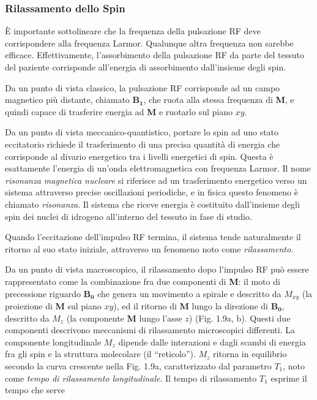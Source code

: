 \documentclass[leqno,10pt,twocolumn,a4paper]{article}
\begin{document}
	\subsubsection{Rilassamento dello Spin}
	È importante sottolineare che la frequenza della pulsazione RF deve corrispondere alla frequenza Larmor. Qualunque altra frequenza non sarebbe efficace. Effettivamente, l'assorbimento della pulsazione RF da
	parte del tessuto del paziente corrisponde all'energia di assorbimento dall'insieme degli spin. \par Da un punto di vista classico, la pulsazione RF corrisponde ad un campo magnetico più distante, chiamato
	$\boldsymbol{B_1}$, che ruota alla stessa frequenza di \textbf{M}, e quindi capace di trasferire energia ad \textbf{M} e ruotarlo sul piano $xy$. \par Da un punto di vista meccanico-quantistico, portare lo
	spin ad uno stato eccitatorio richiede il trasferimento di una precisa quantità di energia che corrisponde al divario energetico tra i livelli energetici di spin. Questa è esattamente l'energia di un'onda
	elettromagnetica con frequenza Larmor. Il nome \textit{risonanza magnetica nucleare} si riferisce ad un trasferimento energetico verso un sistema attraverso precise oscillazioni periodiche, e in fisica questo
	fenomeno è chiamato \textit{risonanza}. Il sistema che riceve energia è costituito dall'insieme degli spin dei nuclei di idrogeno all'interno del tessuto in fase di studio. \par Quando l'eccitazione dell'impulso RF
	termina, il sistema tende naturalmente il ritorno al suo stato iniziale, attraverso un fenomeno noto come \textit{rilassamento}. \par Da un punto di vista macroscopico, il rilassamento dopo l'impulso RF può
	essere rappresentato come la combinazione fra due componenti di \textbf{M}: il moto di precessione riguardo $\boldsymbol{B_0}$ che genera un movimento a spirale e descritto da $M_{xy}$ (la proiezione
	di \textbf{M} sul piano $xy$), ed il ritorno di \textbf{M} lungo la direzione di $\boldsymbol{B_0}$, descritto da $M_z$ (la componente \textbf{M} lungo l'asse $z$) (Fig. 1.9a, b). Questi due componenti descrivono
	meccanismi di rilassamento microscopici differenti. La componente longitudinale $M_z$ dipende dalle interazioni e dagli scambi di energia fra gli spin e la struttura molecolare (il ``reticolo''). $M_z$ ritorna in
	equilibrio secondo la curva crescente nella Fig. 1.9a, caratterizzato dal parametro $T_1$, noto come \textit{tempo di rilassamento longitudinale}. Il tempo di rilassamento $T_1$ esprime il tempo che serve
\end{document}
